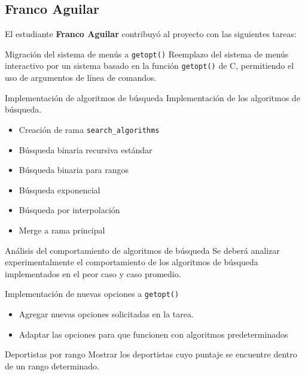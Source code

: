 \subsection*{Franco Aguilar}
El estudiante \textbf{Franco Aguilar} contribuyó al proyecto con las siguientes tareas:

\begin{taskdone}{Migración del sistema de menús a \texttt{getopt()}}
    Reemplazo del sistema de menús interactivo por un sistema basado en la función \texttt{getopt()} de C, permitiendo el uso de argumentos de línea de comandos.
\end{taskdone}

\begin{taskdone}{Implementación de algoritmos de búsqueda}
    Implementación de los algoritmos de búsqueda.
    \begin{itemize}
        \item Creación de rama \texttt{search\_algorithms}
        \item Búsqueda binaria recursiva estándar
        \item Búsqueda binaria para rangos
        \item Búsqueda exponencial
        \item Búsqueda por interpolación
        \item Merge a rama principal
    \end{itemize}
\end{taskdone}

\begin{taskdone}{Análisis del comportamiento de algoritmos de búsqueda}
    Se deberá analizar experimentalmente el comportamiento de los algoritmos de búsqueda implementados en el peor caso y caso promedio.
\end{taskdone}

\begin{taskdone}{Implementación de nuevas opciones a \texttt{getopt()}}
    \begin{itemize}
        \item Agregar nuevas opciones solicitadas en la tarea.
        \item Adaptar las opciones para que funcionen con algoritmos predeterminados
    \end{itemize}
\end{taskdone}

\begin{taskdone}{Deportistas por rango}
    Mostrar los deportistas cuyo puntaje se encuentre dentro de un rango determinado.
\end{taskdone}